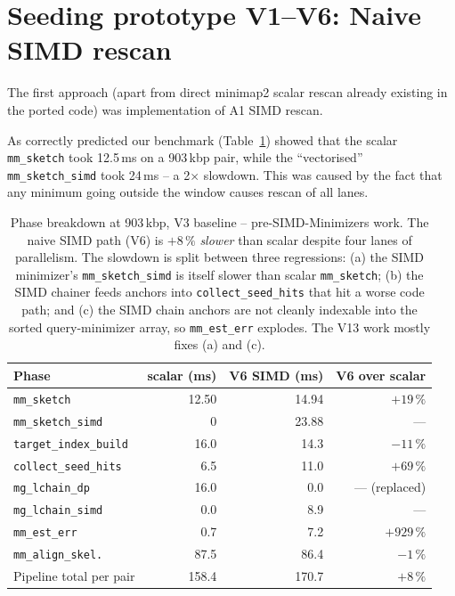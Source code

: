 \section{Seeding prototype V1--V6: Naive SIMD rescan}
\label{sec:v6-rescan}

The first approach (apart from direct minimap2 scalar rescan already existing in the ported code) was implementation of A1 SIMD rescan.

As correctly predicted our benchmark (Table~\ref{tab:v6-phase}) showed that the scalar
\texttt{mm\_sketch} took 12.5\,ms on a 903\,kbp pair, while the
``vectorised'' \texttt{mm\_sketch\_simd} took 24\,ms -- a 2$\times$
slowdown. This was caused by the fact that any minimum going outside the window causes rescan of all lanes.

\begin{table}[H]
  \centering
  \begin{tabular}{lrrr}
    \toprule
    Phase & scalar (ms) & V6 SIMD (ms) & V6 over scalar \\
    \midrule
    \texttt{mm\_sketch}      & 12.50 & 14.94 & $+19\,\%$ \\
    \texttt{mm\_sketch\_simd} & 0    & 23.88 & --- \\
    \texttt{target\_index\_build} & 16.0 & 14.3 & $-11\,\%$ \\
    \texttt{collect\_seed\_hits} & 6.5  & 11.0 & $+69\,\%$ \\
    \texttt{mg\_lchain\_dp}   & 16.0 & 0.0  & --- (replaced) \\
    \texttt{mg\_lchain\_simd} & 0.0  & 8.9  & --- \\
    \texttt{mm\_est\_err}     & 0.7  & 7.2  & $+929\,\%$ \\
    \texttt{mm\_align\_skel.}  & 87.5 & 86.4 & $-1\,\%$ \\
    \midrule
    Pipeline total per pair & 158.4 & 170.7 & $+8\,\%$ \\
    \bottomrule
  \end{tabular}
  \caption{Phase breakdown at 903\,kbp, V3 baseline -- pre-SIMD-Minimizers
    work. The naive SIMD path (V6) is $+8\,\%$ \emph{slower} than
    scalar despite four lanes of parallelism. The slowdown is split
    between three regressions: (a) the SIMD minimizer's
    \texttt{mm\_sketch\_simd} is itself slower than scalar
    \texttt{mm\_sketch}; (b) the SIMD chainer feeds anchors into
    \texttt{collect\_seed\_hits} that hit a worse code path; and
    (c) the SIMD chain anchors are not cleanly indexable into the
    sorted query-minimizer array, so \texttt{mm\_est\_err} explodes.
    The V13 work mostly fixes (a) and (c).}
  \label{tab:v6-phase}
\end{table}

